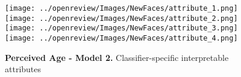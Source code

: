 \begin{figure}[hbt!]
  \texttt{[image: ../openreview/Images/NewFaces/attribute\_1.png]}
\endminipage\hfill
{}
  \texttt{[image: ../openreview/Images/NewFaces/attribute\_2.png]}
\endminipage\hfill
{}
  \texttt{[image: ../openreview/Images/NewFaces/attribute\_3.png]}
\endminipage\hfill
{}
  \texttt{[image: ../openreview/Images/NewFaces/attribute\_4.png]}
\endminipage\hfill
\caption{\textbf{Perceived Age - Model 2.} Classifier-specific interpretable attributes}
\label{fig: introduction}
\end{figure}

